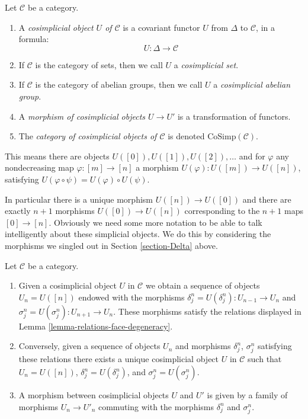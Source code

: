 \begin{definition}
\label{definition-cosimplicial-object}
Let $\mathcal{C}$ be a category.
\begin{enumerate}
\item A {\it cosimplicial object $U$ of $\mathcal{C}$}
is a covariant functor $U$ from $\Delta$ to
$\mathcal{C}$, in a formula:
$$
U : \Delta \longrightarrow \mathcal{C}
$$
\item If $\mathcal{C}$ is the category of sets, then we call
$U$ a {\it cosimplicial set}.
\item If $\mathcal{C}$ is the category of abelian groups,
then we call $U$ a {\it cosimplicial abelian group}.
\item A {\it morphism of cosimplicial objects $U \to U'$}
is a transformation of functors.
\item The {\it category of cosimplicial objects of $\mathcal{C}$}
is denoted $\text{CoSimp}(\mathcal{C})$.
\end{enumerate}
\end{definition}

\noindent
This means there are objects $U([0]), U([1]), U([2]), \ldots$
and for $\varphi$ any nondecreasing map $\varphi : [m] \to [n]$
a morphism $U(\varphi) : U([m]) \to U([n])$, satisfying
$U(\varphi \circ \psi) = U(\varphi) \circ U(\psi)$.

\medskip\noindent
In particular there is a unique morphism $U([n]) \to U([0])$ and there are
exactly $n + 1$ morphisms $U([0]) \to U([n])$ corresponding to
the $n + 1$ maps $[0] \to [n]$. Obviously we need some more notation
to be able to talk intelligently about these simplicial objects.
We do this by considering the morphisms we singled out in
Section \ref{section-Delta} above.

\begin{lemma}
\label{lemma-characterize-cosimplicial-object}
Let $\mathcal{C}$ be a category.
\begin{enumerate}
\item Given a cosimplicial object $U$ in $\mathcal{C}$
we obtain a sequence of objects $U_n = U([n])$ endowed
with the morphisms $\delta^n_j = U(\delta^n_j) : U_{n - 1} \to U_n$ and
$\sigma^n_j = U(\sigma^n_j) : U_{n + 1} \to U_n$. These morphisms
satisfy the relations displayed in
Lemma \ref{lemma-relations-face-degeneracy}.
\item Conversely, given a sequence of objects $U_n$ and morphisms
$\delta^n_j$, $\sigma^n_j$ satisfying these relations there exists a unique
cosimplicial object $U$ in $\mathcal{C}$ such that $U_n = U([n])$,
$\delta^n_j = U(\delta^n_j)$, and $\sigma^n_j = U(\sigma^n_j)$.
\item A morphism between cosimplicial objects $U$ and $U'$
is given by a family of morphisms $U_n \to U'_n$ commuting
with the morphisms $\delta^n_j$ and $\sigma^n_j$.
\end{enumerate}
\end{lemma}


